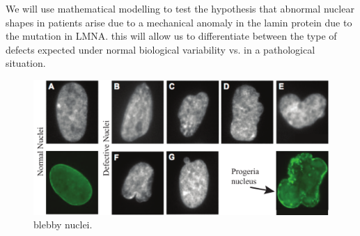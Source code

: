 We will use mathematical modelling to test the hypothesis that abnormal nuclear shapes in patients arise due to a mechanical anomaly in the lamin protein due to the mutation in LMNA. this will allow us to differentiate between the type of defects expected under normal biological variability vs. in a pathological situation. 

\begin{figure}[h]
\centering
\captionsetup{width=.9\linewidth}
\includegraphics[width=6in]{Project3/figs/blebnuclei}
\caption{blebby nuclei.}
\label{fig::blebnuclei}
\end{figure}
